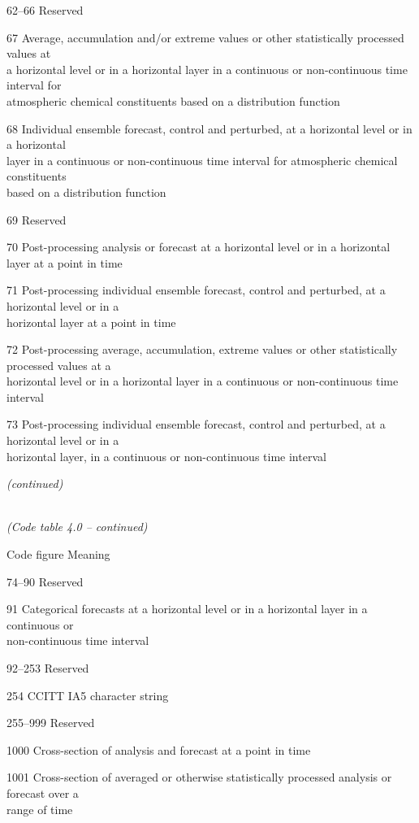 62--66 Reserved

67 Average, accumulation and/or extreme values or other statistically processed values at\\
a horizontal level or in a horizontal layer in a continuous or non-continuous time interval for\\
atmospheric chemical constituents based on a distribution function

68 Individual ensemble forecast, control and perturbed, at a horizontal level or in a horizontal\\
layer in a continuous or non-continuous time interval for atmospheric chemical constituents\\
based on a distribution function

69 Reserved

70 Post-processing analysis or forecast at a horizontal level or in a horizontal layer at a point in time

71 Post-processing individual ensemble forecast, control and perturbed, at a horizontal level or in a\\
horizontal layer at a point in time

72 Post-processing average, accumulation, extreme values or other statistically processed values at a\\
horizontal level or in a horizontal layer in a continuous or non-continuous time interval

73 Post-processing individual ensemble forecast, control and perturbed, at a horizontal level or in a\\
horizontal layer, in a continuous or non-continuous time interval

\emph{(continued)}

\emph{\\
(Code table 4.0 -- continued)}

Code figure Meaning

74--90 Reserved

91 Categorical forecasts at a horizontal level or in a horizontal layer in a continuous or\\
non-continuous time interval

92--253 Reserved

254 CCITT IA5 character string

255--999 Reserved

1000 Cross-section of analysis and forecast at a point in time

1001 Cross-section of averaged or otherwise statistically processed analysis or forecast over a\\
range of time

